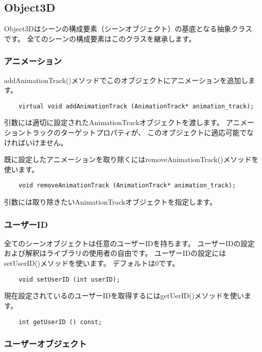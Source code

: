 
\subsection{Object3D}

Object3Dはシーンの構成要素（シーンオブジェクト）の基底となる抽象クラスです。
全てのシーンの構成要素はこのクラスを継承します。

\subsubsection{アニメーション}

addAnimationTrack()メソッドでこのオブジェクトにアニメーションを追加します。

\begin{verbatim}
    virtual void addAnimationTrack (AnimationTrack* animation_track);
\end{verbatim}

引数には適切に設定されたAnimationTrackオブジェクトを渡します。
アニメーショントラックのターゲットプロパティが、
このオブジェクトに適応可能でなければいけません。

既に設定したアニメーションを取り除くにはremoveAnimationTrack()メソッドを使います。

\begin{verbatim}
    void removeAnimationTrack (AnimationTrack* animation_track);
\end{verbatim}

引数には取り除きたいAnimationTrackオブジェクトを指定します。

\subsubsection{ユーザーID}

全てのシーンオブジェクトは任意のユーザーIDを持ちます。
ユーザーIDの設定および解釈はライブラリの使用者の自由です。
ユーザーIDの設定にはsetUserID()メソッドを使います。
デフォルトは0です。

\begin{verbatim}
    void setUserID (int userID);
\end{verbatim}

現在設定されているのユーザーIDを取得するにはgetUerID()メソッドを使います。

\begin{verbatim}
    int getUserID () const;
\end{verbatim}

\subsubsection{ユーザーオブジェクト}

